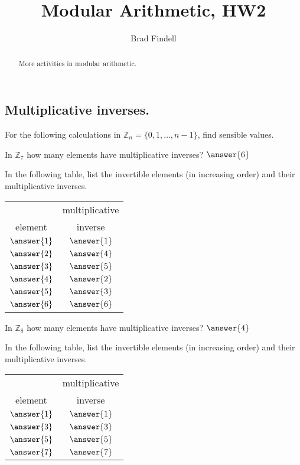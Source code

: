 \documentclass[space,nooutcomes,handout]{ximera}
\title{Modular Arithmetic, HW2}
\author{Brad Findell}
\begin{document}
\begin{abstract}
More activities in modular arithmetic.  
\end{abstract}
\maketitle


\subsection*{Multiplicative inverses.}  For the following calculations in $\mathbb{Z}_{n} = \{0, 1, \dots, n-1\}$, find sensible values.  

\begin{problem}
In $\mathbb{Z}_{7}$ how many elements have multiplicative inverses?   $\answer{6}$
\begin{problem} 
In the following table, list the invertible elements (in increasing order) and their multiplicative inverses. 
\begin{image}
\begin{tabular}{c | c}
\hline
              & multiplicative \\
element & inverse \\
\hline
$\answer{1}$ & $\answer{1}$ \\
$\answer{2}$ & $\answer{4}$ \\
$\answer{3}$ & $\answer{5}$ \\
$\answer{4}$ & $\answer{2}$ \\
$\answer{5}$ & $\answer{3}$ \\
$\answer{6}$ & $\answer{6}$ \\
\hline
\end{tabular}
\end{image}
\end{problem}
\end{problem}

\begin{problem}
In $\mathbb{Z}_{8}$ how many elements have multiplicative inverses?   $\answer{4}$
\begin{problem} 
In the following table, list the invertible elements (in increasing order) and their multiplicative inverses. 
\begin{image}
\begin{tabular}{c | c}
\hline
              & multiplicative \\
element & inverse \\
\hline
$\answer{1}$ & $\answer{1}$ \\
$\answer{3}$ & $\answer{3}$ \\
$\answer{5}$ & $\answer{5}$ \\
$\answer{7}$ & $\answer{7}$ \\
\hline
\end{tabular}
\end{image}
\end{problem}
\end{problem}
\end{document}
